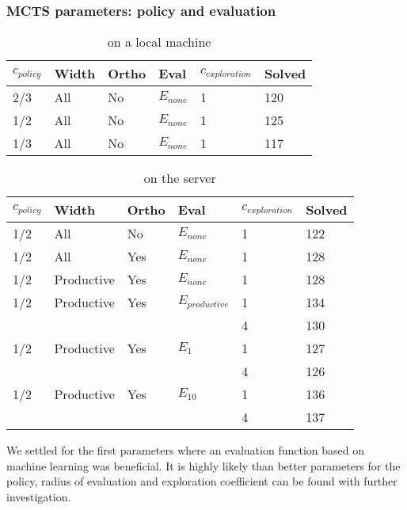 \documentclass[runningheads,a4paper,draft]{svjour3}
\newcommand{\ra}[1]{\renewcommand{\arraystretch}{#1}}
\begin{document}
\subsubsection{MCTS parameters: policy and evaluation}

\begin{table}[ht]
\centering\ra{1.3}
\small
\begin{tabular}{llllll}
\toprule
 $c_{policy}$ & Width & Ortho & Eval & $c_{exploration}$ & Solved \\
\midrule
 2/3 & All & No & $E_{none}$ & 1 & 120\\
 1/2 & All & No & $E_{none}$ & 1 & 125\\
 1/3 & All & No & $E_{none}$ & 1 & 117\\
\bottomrule
\end{tabular}
\caption{\label{tab:cost_param} on a local machine}
\end{table}


\begin{table}[ht]
\centering\ra{1.3}
\small
\begin{tabular}{llllll}
\toprule
  $c_{policy}$ & Width & Ortho & Eval & $c_{exploration}$ & Solved \\
\midrule
 1/2 & All & No & $E_{none}$ & 1 & 122\\
 1/2 & All & Yes & $E_{none}$ & 1 & 128\\
 1/2 & Productive & Yes & $E_{none}$ & 1 & 128\\
 1/2 & Productive & Yes & $E_{productive}$ & 1 & 134\\ 
 &  & &  & 4 & 130\\
 1/2 & Productive & Yes & $E_1$ & 1 & 127\\ 
 & & & & 4 & 126\\ 
 1/2 & Productive & Yes & $E_{10}$ & 1 & 136\\ 
 & & & & 4 & 137\\ 
\bottomrule
\end{tabular}
\caption{\label{tab:learning} on the server}
\end{table}

We settled for the first parameters where an evaluation function based on 
machine learning was beneficial. It is highly likely than better parameters for 
the policy, radius of evaluation and exploration coefficient can be found with 
further investigation.
\end{document}
